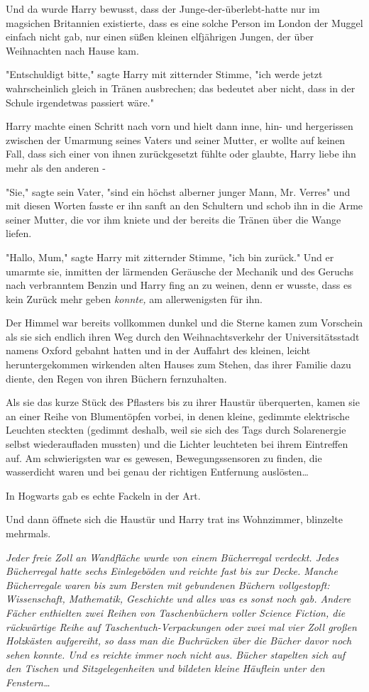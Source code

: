 {Und da wurde Harry bewusst, dass der Junge-der-überlebt-hatte nur im magsichen Britannien existierte, dass es eine solche Person im London der Muggel einfach nicht gab, nur einen süßen kleinen elfjährigen Jungen, der über Weihnachten nach Hause kam.

"Entschuldigt bitte," sagte Harry mit zitternder Stimme, "ich werde jetzt wahrscheinlich gleich in Tränen ausbrechen; das bedeutet aber nicht, dass in der Schule irgendetwas passiert wäre."

Harry machte einen Schritt nach vorn und hielt dann inne, hin- und hergerissen zwischen der Umarmung seines Vaters und seiner Mutter, er wollte auf keinen Fall, dass sich einer von ihnen zurückgesetzt fühlte oder glaubte, Harry liebe ihn mehr als den anderen -

"Sie," sagte sein Vater, "sind ein höchst alberner junger Mann, Mr. Verres" und mit diesen Worten fasste er ihn sanft an den Schultern und schob ihn in die Arme seiner Mutter, die vor ihm kniete und der bereits die Tränen über die Wange liefen.

"Hallo, Mum," sagte Harry mit zitternder Stimme, "ich bin zurück." Und er umarmte sie, inmitten der lärmenden Geräusche der Mechanik und des Geruchs nach verbranntem Benzin und Harry fing an zu weinen, denn er wusste, dass es kein Zurück mehr geben \emph{konnte,} am allerwenigsten für ihn.

\later

Der Himmel war bereits vollkommen dunkel und die Sterne kamen zum Vorschein als sie sich endlich ihren Weg durch den Weihnachtsverkehr der Universitätsstadt namens Oxford gebahnt hatten und in der Auffahrt des kleinen, leicht heruntergekommen wirkenden alten Hauses zum Stehen, das ihrer Familie dazu diente, den Regen von ihren Büchern fernzuhalten.

Als sie das kurze Stück des Pflasters bis zu ihrer Haustür überquerten, kamen sie an einer Reihe von Blumentöpfen vorbei, in denen kleine, gedimmte elektrische Leuchten steckten (gedimmt deshalb, weil sie sich des Tags durch Solarenergie selbst wiederaufladen mussten) und die Lichter leuchteten bei ihrem Eintreffen auf. Am schwierigsten war es gewesen, Bewegungssensoren zu finden, die wasserdicht waren und bei genau der richtigen Entfernung auslösten…

In Hogwarts gab es echte Fackeln in der Art.

Und dann öffnete sich die Haustür und Harry trat ins Wohnzimmer, blinzelte mehrmals.

\emph{Jeder freie Zoll an Wandfläche wurde von einem Bücherregal verdeckt. Jedes Bücherregal hatte sechs Einlegeböden und reichte fast bis zur Decke. Manche Bücherregale waren bis zum Bersten mit gebundenen Büchern vollgestopft: Wissenschaft, Mathematik, Geschichte und alles was es sonst noch gab. Andere Fächer enthielten zwei Reihen von Taschenbüchern voller Science Fiction, die rückwärtige Reihe auf Taschentuch-Verpackungen oder zwei mal vier Zoll großen Holzkästen aufgereiht, so dass man die Buchrücken über die Bücher davor noch sehen konnte. Und es reichte immer noch nicht aus. Bücher stapelten sich auf den Tischen und Sitzgelegenheiten und bildeten kleine Häuflein unter den Fenstern…}

}
